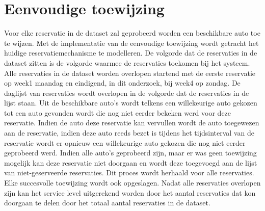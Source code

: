 \section{Eenvoudige toewijzing} \label{eenvoudige-toewijzing}
Voor elke reservatie in de dataset zal geprobeerd worden een beschikbare auto toe te wijzen. Met de implementatie van de eenvoudige toewijzing wordt getracht het huidige reservatiemechanisme te modelleren. De volgorde dat de reservaties in de dataset zitten is de volgorde waarmee de reservaties toekomen bij het systeem. Alle reservaties in de dataset worden overlopen startend met de eerste reservatie op week1 maandag en eindigend, in dit onderzoek, bij week4 op zondag. De daglijst van reservaties wordt overlopen in de volgorde dat de reservaties in de lijst staan. Uit de beschikbare auto's wordt telkens een willekeurige auto gekozen tot een auto gevonden wordt die nog niet eerder bekeken werd voor deze reservatie. Indien de auto deze reservatie kan vervullen wordt de auto toegewezen aan de reservatie, indien deze auto reeds bezet is tijdens het tijdsinterval van de reservatie wordt er opnieuw een willekeurige auto gekozen die nog niet eerder geprobeerd werd. Indien alle auto's geprobeerd zijn, maar er was geen toewijzing mogelijk kan deze reservatie niet doorgaan en wordt deze toegevoegd aan de lijst van niet-geserveerde reservaties. Dit proces wordt herhaald voor alle reservaties. Elke succesvolle toewijzing wordt ook opgeslagen. Nadat alle reservaties overlopen zijn kan het service level uitgerekend worden door het aantal reservaties dat kon doorgaan te delen door het totaal aantal reservaties in de dataset. 
